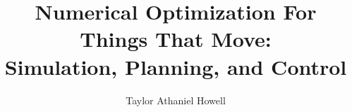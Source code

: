 \documentclass[10pt]{report}
\begin{document}
\title{Numerical Optimization For Things That Move: \\ 
Simulation, Planning, and Control}
\author{Taylor Athaniel Howell}


\beforepreface
%
\afterpreface





 

 


{\small } %

\end{document}
